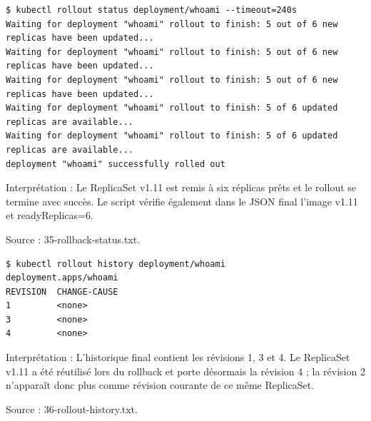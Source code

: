 \documentclass[11pt,a4paper]{article}
\begin{document}
\par\medskip\noindent\begin{minipage}{\linewidth}
\par\vspace{4pt}\noindent\begin{minipage}{\linewidth}
\begin{Verbatim}[breaklines=true,breakanywhere=true,fontsize=\footnotesize,frame=single,framesep=8pt,rulecolor=\color{teal}]
$ kubectl rollout status deployment/whoami --timeout=240s
Waiting for deployment "whoami" rollout to finish: 5 out of 6 new replicas have been updated...
Waiting for deployment "whoami" rollout to finish: 5 out of 6 new replicas have been updated...
Waiting for deployment "whoami" rollout to finish: 5 out of 6 new replicas have been updated...
Waiting for deployment "whoami" rollout to finish: 5 of 6 updated replicas are available...
Waiting for deployment "whoami" rollout to finish: 5 of 6 updated replicas are available...
deployment "whoami" successfully rolled out
\end{Verbatim}
\end{minipage}\par\vspace{6pt}

Interprétation : Le ReplicaSet v1.11 est remis à six réplicas prêts et le rollout se termine avec succès. Le script vérifie également dans le JSON final l'image v1.11 et readyReplicas=6.

{\footnotesize\color{teal} Source : 35-rollback-status.txt.\par}
\end{minipage}\par\medskip

\par\medskip\noindent\begin{minipage}{\linewidth}
\par\vspace{4pt}\noindent\begin{minipage}{\linewidth}
\begin{Verbatim}[breaklines=true,breakanywhere=true,fontsize=\footnotesize,frame=single,framesep=8pt,rulecolor=\color{teal}]
$ kubectl rollout history deployment/whoami
deployment.apps/whoami 
REVISION  CHANGE-CAUSE
1         <none>
3         <none>
4         <none>
\end{Verbatim}
\end{minipage}\par\vspace{6pt}

Interprétation : L'historique final contient les révisions 1, 3 et 4. Le ReplicaSet v1.11 a été réutilisé lors du rollback et porte désormais la révision 4 ; la révision 2 n'apparaît donc plus comme révision courante de ce même ReplicaSet.

{\footnotesize\color{teal} Source : 36-rollout-history.txt.\par}
\end{minipage}\par\medskip
\end{document}
